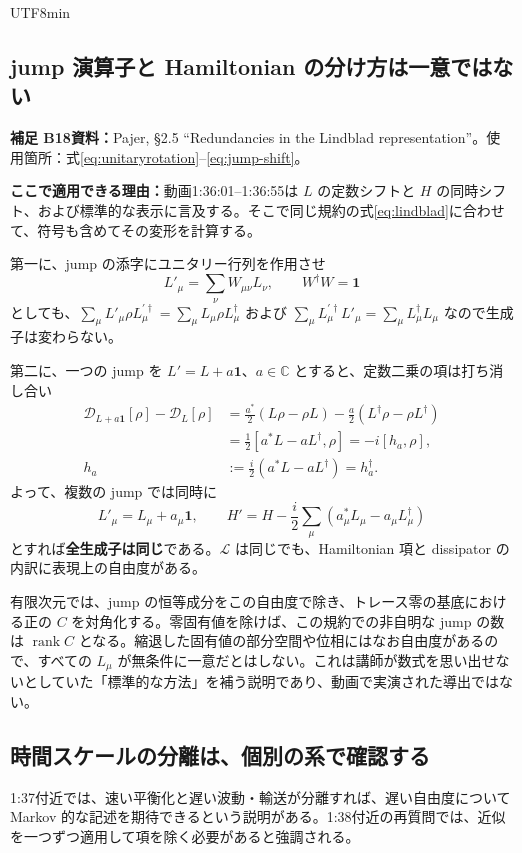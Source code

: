 \documentclass[11pt,a4paper]{article}
\numberwithin{equation}{section}
\newcommand{\rank}{\operatorname{rank}}
\newcommand{\I}{\mathbf{1}}
\newcommand{\D}[1]{\mathcal D_{#1}}
\newcommand{\supp}[3]{\par\smallskip\noindent\textcolor{BrickRed}{\textbf{補足 #1}}\quad\textbf{資料：}#2\par\noindent\textbf{ここで適用できる理由：}#3\par}
\begin{document}
\begin{CJK*}{UTF8}{min}
\subsection{jump 演算子と Hamiltonian の分け方は一意ではない}
\supp{B18}{Pajer\cite{pajer}, §2.5 ``Redundancies in the Lindblad representation''。使用箇所：式\eqref{eq:unitaryrotation}--\eqref{eq:jump-shift}。}{動画1:36:01--1:36:55は $L$ の定数シフトと $H$ の同時シフト、および標準的な表示に言及する。そこで同じ規約の式\eqref{eq:lindblad}に合わせて、符号も含めてその変形を計算する。}
第一に、jump の添字にユニタリー行列を作用させ
\begin{equation}
L'_\mu=\sum_\nu W_{\mu\nu}L_\nu,\qquad W^\dagger W=\I
\label{eq:unitaryrotation}
\end{equation}
としても、$\sum_\mu L'_\mu\rho L_\mu^{\prime\dagger}=\sum_\mu L_\mu\rho L_\mu^\dagger$ および $\sum_\mu L_\mu^{\prime\dagger}L'_\mu=\sum_\mu L_\mu^\dagger L_\mu$ なので生成子は変わらない。

第二に、一つの jump を $L'=L+a\I$、$a\in\mathbb C$ とすると、定数二乗の項は打ち消し合い
\begin{align}
\D{L+a\I}[\rho]-\D{L}[\rho]
&=\frac{a^*}{2}(L\rho-\rho L)
-\frac{a}{2}(L^\dagger\rho-\rho L^\dagger)\nonumber\\
&=\frac12[a^*L-aL^\dagger,\rho]
=-i[h_a,\rho],\\
h_a&:=\frac{i}{2}(a^*L-aL^\dagger)=h_a^\dagger.
\end{align}
よって、複数の jump では同時に
\begin{equation}
\boxed{L'_\mu=L_\mu+a_\mu\I,\qquad
H'=H-\frac{i}{2}\sum_\mu(a_\mu^*L_\mu-a_\mu L_\mu^\dagger)}
\label{eq:jump-shift}
\end{equation}
とすれば\textbf{全生成子は同じ}である。$\mathcal L$ は同じでも、Hamiltonian 項と dissipator の内訳に表現上の自由度がある。

有限次元では、jump の恒等成分をこの自由度で除き、トレース零の基底における正の $C$ を対角化する。零固有値を除けば、この規約での非自明な jump の数は $\rank C$ となる。縮退した固有値の部分空間や位相にはなお自由度があるので、すべての $L_\mu$ が無条件に一意だとはしない。これは講師が数式を思い出せないとしていた「標準的な方法」を補う説明であり、動画で実演された導出ではない。

\subsection{時間スケールの分離は、個別の系で確認する}
1:37付近では、速い平衡化と遅い波動・輸送が分離すれば、遅い自由度について Markov 的な記述を期待できるという説明がある。1:38付近の再質問では、近似を一つずつ適用して項を除く必要があると強調される。


\end{CJK*}
\end{document}
